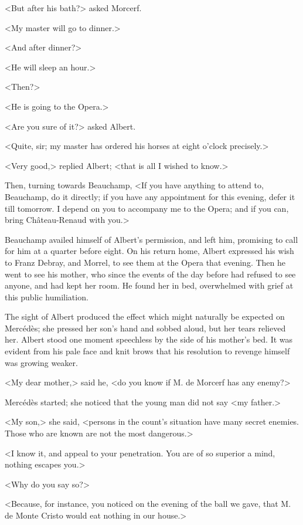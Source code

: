  <But after his bath?> asked Morcerf. 

 <My master will go to dinner.> 

 <And after dinner?> 

 <He will sleep an hour.> 

 <Then?> 

 <He is going to the Opera.> 

 <Are you sure of it?> asked Albert. 

 <Quite, sir; my master has ordered his horses at eight o'clock precisely.> 

 <Very good,> replied Albert; <that is all I wished to know.> 

 Then, turning towards Beauchamp, <If you have anything to attend to, Beauchamp, do it directly; if you have any appointment for this evening, defer it till tomorrow. I depend on you to accompany me to the Opera; and if you can, bring Château-Renaud with you.> 

 Beauchamp availed himself of Albert's permission, and left him, promising to call for him at a quarter before eight. On his return home, Albert expressed his wish to Franz Debray, and Morrel, to see them at the Opera that evening. Then he went to see his mother, who since the events of the day before had refused to see anyone, and had kept her room. He found her in bed, overwhelmed with grief at this public humiliation. 

 The sight of Albert produced the effect which might naturally be expected on Mercédès; she pressed her son's hand and sobbed aloud, but her tears relieved her. Albert stood one moment speechless by the side of his mother's bed. It was evident from his pale face and knit brows that his resolution to revenge himself was growing weaker. 

 <My dear mother,> said he, <do you know if M. de Morcerf has any enemy?> 

 Mercédès started; she noticed that the young man did not say <my father.> 

 <My son,> she said, <persons in the count's situation have many secret enemies. Those who are known are not the most dangerous.> 

 <I know it, and appeal to your penetration. You are of so superior a mind, nothing escapes you.> 

 <Why do you say so?> 

 <Because, for instance, you noticed on the evening of the ball we gave, that M. de Monte Cristo would eat nothing in our house.> 

